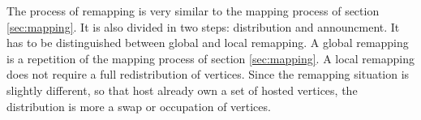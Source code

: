 The process of remapping is very similar to the mapping process of
section \ref{sec:mapping}.  It is also divided in two steps:
distribution and announcment. It has to be distinguished between
global and local remapping. A global remapping is a repetition of the
mapping process of section \ref{sec:mapping}. A local remapping does
not require a full redistribution of vertices.  Since the remapping
situation is slightly different, so that host already own a set of
hosted vertices, the distribution is more a swap or occupation of
vertices.


\cleardoublepage

